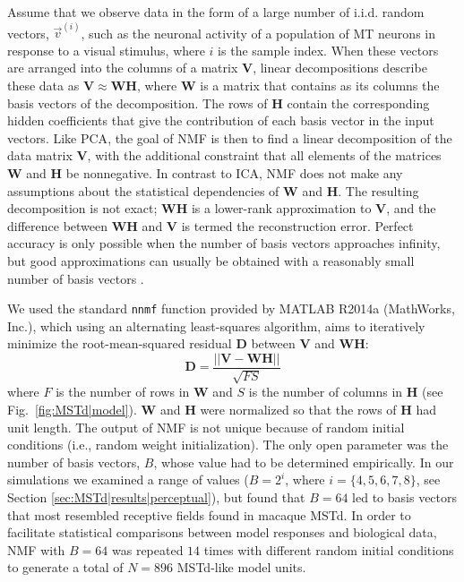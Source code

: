 Assume that we observe data in the form of a large number of i.i.d. random 
vectors, $\vec{v}^{(i)}$, such as the neuronal activity of a population of 
\ac{MT} neurons in response to a visual stimulus, where $i$ is the sample 
index. When these vectors are arranged into the columns of a matrix \textbf{V},
linear decompositions describe these data as 
$\mathbf{V} \approx \mathbf{W} \mathbf{H}$, where \textbf{W} is a matrix that
contains as its columns the basis vectors of the decomposition. 
The rows of \textbf{H} contain the corresponding hidden coefficients that 
give the contribution of each basis vector in the input vectors. 
Like \acf{PCA}, the goal of \ac{NMF} is then to find a linear decomposition 
of the data matrix \textbf{V}, with the additional constraint that all 
elements of the matrices \textbf{W} and \textbf{H} be nonnegative. 
In contrast to \acf{ICA}, \ac{NMF} does not make any assumptions about the
statistical dependencies of \textbf{W} and \textbf{H}. 
The resulting decomposition is not exact; \textbf{WH} is a lower-rank 
approximation to \textbf{V}, and the difference between \textbf{WH} and 
\textbf{V} is termed the reconstruction error. 
Perfect accuracy is only possible when the number of basis vectors approaches
infinity, but good approximations can usually be obtained with a reasonably 
small number of basis vectors \citep{PougetSejnowski1997}.

We used the standard \texttt{nnmf} function provided by MATLAB R2014a 
(MathWorks, Inc.), which using an alternating least-squares algorithm, 
aims to iteratively minimize the root-mean-squared residual \textbf{D} 
between \textbf{V} and \textbf{WH}:
\begin{equation}
\mathbf{D} = \frac{||\mathbf{V} - \mathbf{WH}||}{\sqrt{FS}} 
\label{eqn:MSTd|methods|NMF}
\end{equation}
where $F$ is the number of rows in \textbf{W} and $S$ is the number of columns
in \textbf{H} (see Fig.~\ref{fig:MSTd|model}). \textbf{W} and \textbf{H}
were normalized so that the rows of \textbf{H} had unit length. 
The output of \ac{NMF} is not unique because of random initial conditions 
(i.e., random weight initialization).
The only open parameter was the number of basis vectors, $B$, whose value 
had to be determined empirically. In our simulations we examined a range 
of values ($B=2^i$, where $i=\{4,5,6,7,8\}$, see
Section \ref{sec:MSTd|results|perceptual}), but found that $B=64$ led to 
basis vectors that most resembled receptive fields found in macaque \ac{MSTd}. 
In order to facilitate statistical comparisons between model responses and
biological data, \ac{NMF} with $B=64$ was repeated $14$ times with different 
random initial conditions to generate a total of $N=896$ \ac{MSTd}-like 
model units.


